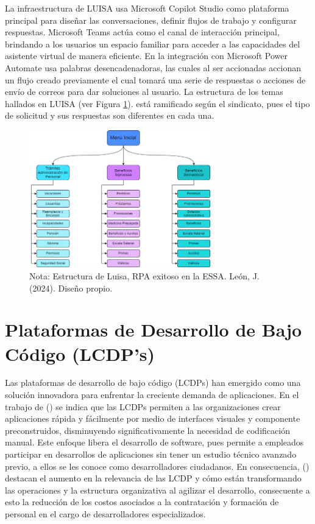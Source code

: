\documentclass[letter,oneside,12pt,spanish]{report}
\begin{document}
\noindent La infraestructura de LUISA usa Microsoft Copilot Studio como plataforma principal para diseñar las conversaciones, definir flujos de trabajo y configurar respuestas. Microsoft Teams actúa como el canal de interacción principal, brindando a los usuarios un espacio familiar para acceder a las capacidades del asistente virtual de manera eficiente. En la integración con Microsoft Power Automate usa palabras desencadenadoras, las cuales al ser accionadas accionan un flujo creado previamente el cual tomará una serie de respuestas o acciones de envío de correos para dar soluciones al usuario. La estructura de los temas hallados en LUISA (ver Figura \ref{fig:LuisaEstructura}). está ramificado según el sindicato, pues el tipo de solicitud y sus respuestas son diferentes en cada una. 

\begin{figure}[ht]
    \centering
    \includegraphics[width=0.7\textwidth]{Figs/estructura luisa.png}
    \label{fig:LuisaEstructura}
    \\Nota: Estructura de Luisa, RPA exitoso en la ESSA. León, J. (2024). Diseño propio.
\end{figure}


\section{Plataformas de Desarrollo de Bajo Código (LCDP's)}

\noindent Las plataformas de desarrollo de bajo código (LCDPs) han emergido como una solución innovadora para enfrentar la creciente demanda de aplicaciones. En el trabajo de (\cite{alsaadi2021lcdp}) se indica que las LCDPs permiten a las organizaciones crear aplicaciones rápida y fácilmente por medio de interfaces visuales y componente preconstruidos, disminuyendo significativamente la necesidad de codificación manual. Este enfoque libera el desarrollo de software, pues permite a empleados participar en desarrollos de aplicaciones sin tener un estudio técnico avanzado previo, a ellos se les conoce como desarrolladores ciudadanos. En consecuencia, (\cite{prinz2021lcdp}) destacan el aumento en la relevancia de las LCDP y cómo están transformando las operaciones y la estructura organizativa al agilizar el desarrollo, consecuente a esto la reducción de los costos asociados a la contratación y formación de personal en el cargo de desarrolladores especializados.
\end{document}

